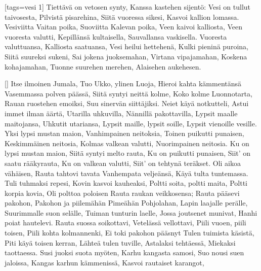 [tags={vesi 1}]
  \beginverse
    Tiettävä on vetosen synty,
    Kanssa kastehen sijentö:
    Vesi on tullut taivosesta,
    Pilvistä pisarehina,
    Siitä vuoressa sikesi,
    Kasvoi kallion lomassa.
    Vesiviitta Vaitan poika,
    Suoviitta Kalevan poika,
    Veen kaivoi kalliosta,
    Veen vuoresta valutti,
    Kepillänsä kultaisella,
    Sauvallansa vaskisella.
  \endverse
  \beginverse
    Vuoresta valuttuansa,
    Kalliosta saatuansa,
    Vesi heilui hettehenä,
    Kulki pieninä puroina,
    Siitä suureksi sukeni,
    Sai jokena juoksemahan,
    Virtana vipajamahan,
    Koskena kohajamahan,
    Tuonne suurehen merehen,
    Alaisehen aukehesen.
  \endverse
\endsong


[]
  \beginverse
    Itse ilmoinen Jumala,
    Tuo Ukko, ylinen Luoja,
    Hieroi kahta kämmentänsä
    Vasemmassa polven päässä,
    Siitä syntyi neittä kolme,
    Koko kolme Luonnotarta,
    Rauan ruostehen emoiksi,
    Suu sinervän siittäjiksi.
  \endverse
  \beginverse
    Neiet käyä notkutteli,
    Astui immet ilman äärtä,
    Utarilla uhkuvilla,
    Nännillä pakottavilla,
    Lypsit maalle maitojansa,
    Uhkutit utariansa,
    Lypsit maille, lypsit soille,
    Lypsit vienoille vesille.
    Yksi lypsi mustan maion,
    Vanhimpainen neitoksia,
    Toinen puikutti punaisen,
    Keskimmäinen neitosia,
    Kolmas valkean valutti,
    Nuorimpainen neitosia.
    Ku on lypsi mustan maion,
    Siitä syntyi melto rauta,
    Ku on puikutti punaisen,
    Siit' on saatu rääkyrauta,
    Ku on valkean valutti,
    Siit' on tehtynä teräkset.
  \endverse
  \beginverse
    Oli aikoa vähäisen,
    Rauta tahtovi tavata
    Vanhempata veljeänsä,
    Käyä tulta tuntemassa.
    Tuli tuhmaksi repesi,
    Kovin kasvoi kauheaksi,
    Poltti soita, poltti maita,
    Poltti korpia kovia,
    Oli polttoa poloisen
    Rauta raukan veikkosensa;
    Rauta pääsevi pakohon,
    Pakohon ja piilemähän
    Pimeähän Pohjolahan,
    Lapin laajalle perälle,
    Suurimmalle suon selälle,
    Tuiman tunturin laelle,
    Jossa joutsenet munivat,
    Hanhi poiat hautelevi.
  \endverse
  \beginverse
    Rauta suossa soikottavi,
    Vetelässä vellottavi,
    Piili vuoen, piili toisen,
    Piili kohta kolmannenki,
    Ei toki pakohon pääsnyt
    Tulen tuimista käsistä,
    Piti käyä toisen kerran,
    Lähteä tulen tuville,
    Astalaksi tehtäessä,
    Miekaksi taottaessa.
  \endverse
  \beginverse
    Susi juoksi suota myöten,
    Karhu kangasta samosi,
    Suo nousi suen jaloissa,
    Kangas karhun kämmenissä,
    Kasvoi rautaiset karangot,
